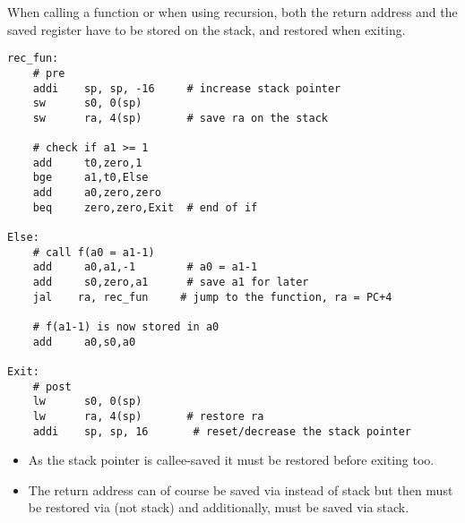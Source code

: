 When calling a function or when using recursion, both the return address  and the saved register  have to be stored on the stack, and restored when exiting.
\begin{lstlisting}[language={[RISC-V]Assembler}]
rec_fun:
    # pre
    addi    sp, sp, -16     # increase stack pointer
    sw      s0, 0(sp)
    sw      ra, 4(sp)       # save ra on the stack

    # check if a1 >= 1
    add     t0,zero,1
    bge     a1,t0,Else
    add     a0,zero,zero
    beq     zero,zero,Exit  # end of if

Else:
    # call f(a0 = a1-1)
    add     a0,a1,-1        # a0 = a1-1
    add     s0,zero,a1      # save a1 for later
    jal    ra, rec_fun     # jump to the function, ra = PC+4

    # f(a1-1) is now stored in a0
    add     a0,s0,a0

Exit:
    # post
    lw      s0, 0(sp)       
    lw      ra, 4(sp)       # restore ra
    addi    sp, sp, 16       # reset/decrease the stack pointer

\end{lstlisting}
\begin{itemize}
    \item As the stack pointer is callee-saved it must be restored before exiting too.
    \item The return address  can of course be saved via  instead of stack but then  must be restored via  (not stack) and additionally,  must be saved via stack.
\end{itemize}


